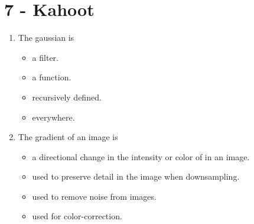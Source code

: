 \newpage

\section*{7 - Kahoot}

\begin{enumerate}
    \item The gaussian is
    \begin{itemize}
        \item a filter.
        \item a function.
        \item recursively defined.
        \item everywhere.
    \end{itemize}
    \item The gradient of an image is
    \begin{itemize}
        \item a directional change in the intensity or color of in an image.
        \item used to preserve detail in the image when downsampling.
        \item used to remove noise from images.
        \item used for color-correction.
    \end{itemize}
\end{enumerate}

